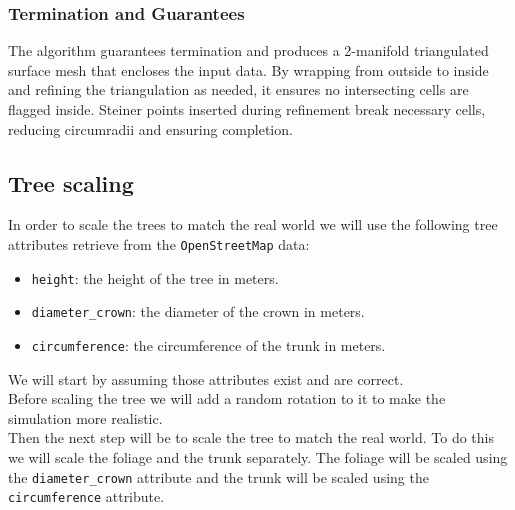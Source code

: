 \documentclass[12pt]{article}
\begin{document}
\subsubsection{Termination and Guarantees}
The algorithm guarantees termination and produces a 2-manifold triangulated
surface mesh that encloses the input data. By wrapping from outside to inside
and refining the triangulation as needed, it ensures no intersecting cells are
flagged inside. Steiner points inserted during refinement break necessary cells,
 reducing circumradii and ensuring completion.

\subsection{Tree scaling}
In order to scale the trees to match the real world we will use the
following tree attributes retrieve from the \texttt{OpenStreetMap} data:
\begin{itemize}
    \item \texttt{height}: the height of the tree in meters.
    \item \texttt{diameter\_crown}: the diameter of the crown in meters.
    \item \texttt{circumference}: the circumference of the trunk in meters.
\end{itemize}

We will start by assuming those attributes exist and are correct.\\
Before scaling the tree we will add a random rotation to it to make the
simulation more realistic.\\
Then the next step will be to scale the tree to match the real world. To do this we
will scale the foliage and the trunk separately. The foliage will be scaled
using the \texttt{diameter\_crown} attribute and the trunk will be scaled using
the \texttt{circumference} attribute.\\
\end{document}
